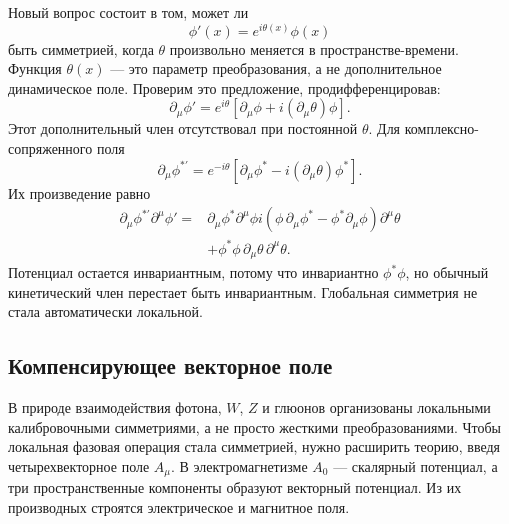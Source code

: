 Новый вопрос состоит в том, может ли
\begin{equation}
  \phi'(x)=e^{i\theta(x)}\phi(x)
  \label{eq:l07-local-u1}
\end{equation}
быть симметрией, когда \(\theta\) произвольно меняется в пространстве-времени. Функция \(\theta(x)\) — это параметр преобразования, а не дополнительное динамическое поле. Проверим это предложение, продифференцировав:
\begin{equation}
  \partial_\mu\phi'
  =e^{i\theta}
   \left[\partial_\mu\phi+i(\partial_\mu\theta)\phi\right].
  \label{eq:l07-local-derivative}
\end{equation}
Этот дополнительный член отсутствовал при постоянной \(\theta\). Для комплексно-сопряженного поля
\begin{equation}
  \partial_\mu\phi^{*\prime}
  =e^{-i\theta}
   \left[\partial_\mu\phi^*-i(\partial_\mu\theta)\phi^*\right].
\end{equation}
Их произведение равно
\begin{align}
  \partial_\mu\phi^{*\prime}\partial^\mu\phi'
  ={}&
  \partial_\mu\phi^*\partial^\mu\phi
  i\left(
      \phi\,\partial_\mu\phi^*
      -\phi^*\partial_\mu\phi
    \right)\partial^\mu\theta
  \nonumber\\
  &+\phi^*\phi\,
    \partial_\mu\theta\,\partial^\mu\theta.
  \label{eq:l07-local-failure}
\end{align}
Потенциал остается инвариантным, потому что инвариантно \(\phi^*\phi\), но обычный кинетический член перестает быть инвариантным. Глобальная симметрия не стала автоматически локальной.

\begin{classroomqa}
\end{classroomqa}

\subsection{Компенсирующее векторное поле}

В природе взаимодействия фотона, \(W\), \(Z\) и глюонов организованы локальными калибровочными симметриями, а не просто жесткими преобразованиями. Чтобы локальная фазовая операция стала симметрией, нужно расширить теорию, введя четырехвекторное поле \(A_\mu\). В электромагнетизме \(A_0\) — скалярный потенциал, а три пространственные компоненты образуют векторный потенциал. Из их производных строятся электрическое и магнитное поля.


